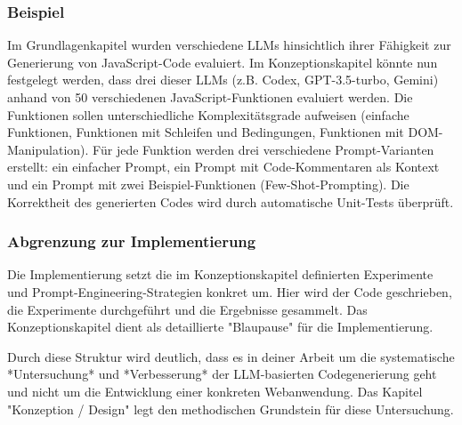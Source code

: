

\subsubsection{Beispiel}

Im Grundlagenkapitel wurden verschiedene LLMs hinsichtlich ihrer Fähigkeit zur Generierung von JavaScript-Code evaluiert. Im Konzeptionskapitel könnte nun festgelegt werden, dass drei dieser LLMs (z.B. Codex, GPT-3.5-turbo, Gemini) anhand von 50 verschiedenen JavaScript-Funktionen evaluiert werden. Die Funktionen sollen unterschiedliche Komplexitätsgrade aufweisen (einfache Funktionen, Funktionen mit Schleifen und Bedingungen, Funktionen mit DOM-Manipulation). Für jede Funktion werden drei verschiedene Prompt-Varianten erstellt: ein einfacher Prompt, ein Prompt mit Code-Kommentaren als Kontext und ein Prompt mit zwei Beispiel-Funktionen (Few-Shot-Prompting). Die Korrektheit des generierten Codes wird durch automatische Unit-Tests überprüft.

\subsubsection{Abgrenzung zur Implementierung}

Die Implementierung setzt die im Konzeptionskapitel definierten Experimente und Prompt-Engineering-Strategien konkret um. Hier wird der Code geschrieben, die Experimente durchgeführt und die Ergebnisse gesammelt. Das Konzeptionskapitel dient als detaillierte "Blaupause" für die Implementierung.

Durch diese Struktur wird deutlich, dass es in deiner Arbeit um die systematische *Untersuchung* und *Verbesserung* der LLM-basierten Codegenerierung geht und nicht um die Entwicklung einer konkreten Webanwendung. Das Kapitel "Konzeption / Design" legt den methodischen Grundstein für diese Untersuchung.
